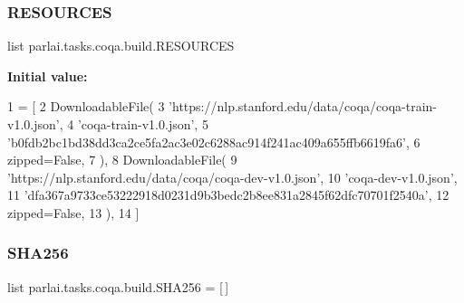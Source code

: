 \mbox{\label{namespaceparlai_1_1tasks_1_1coqa_1_1build_a7bb45b9538e95720878022ca1db0c715}} 
\subsubsection{\texorpdfstring{R\+E\+S\+O\+U\+R\+C\+ES}{RESOURCES}}
{\footnotesize\ttfamily list parlai.\+tasks.\+coqa.\+build.\+R\+E\+S\+O\+U\+R\+C\+ES}

{\bfseries Initial value\+:}
\begin{DoxyCode}
1 =  [
2     DownloadableFile(
3         \textcolor{stringliteral}{'https://nlp.stanford.edu/data/coqa/coqa-train-v1.0.json'},
4         \textcolor{stringliteral}{'coqa-train-v1.0.json'},
5         \textcolor{stringliteral}{'b0fdb2bc1bd38dd3ca2ce5fa2ac3e02c6288ac914f241ac409a655ffb6619fa6'},
6         zipped=\textcolor{keyword}{False},
7     ),
8     DownloadableFile(
9         \textcolor{stringliteral}{'https://nlp.stanford.edu/data/coqa/coqa-dev-v1.0.json'},
10         \textcolor{stringliteral}{'coqa-dev-v1.0.json'},
11         \textcolor{stringliteral}{'dfa367a9733ce53222918d0231d9b3bedc2b8ee831a2845f62dfc70701f2540a'},
12         zipped=\textcolor{keyword}{False},
13     ),
14 ]
\end{DoxyCode}
\mbox{\label{namespaceparlai_1_1tasks_1_1coqa_1_1build_abac5f27f3ac9554a50b41b0088ec3fbb}} 
\subsubsection{\texorpdfstring{S\+H\+A256}{SHA256}}
{\footnotesize\ttfamily list parlai.\+tasks.\+coqa.\+build.\+S\+H\+A256 = \mbox{[}$\,$\mbox{]}}

\mbox{\label{namespaceparlai_1_1tasks_1_1coqa_1_1build_a637aa09169ca463f7944e7ec9554f0e0}} 
